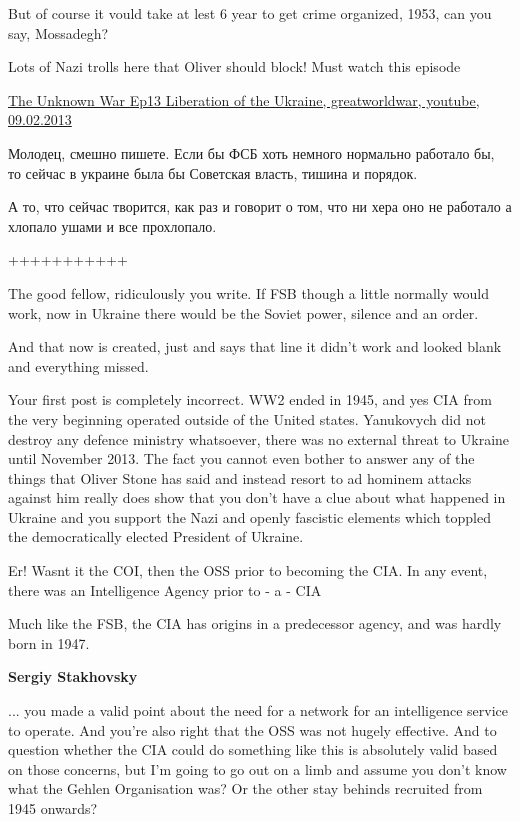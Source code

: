 \begin{itemize}
\begin{itemize}

But of course it vould take at lest 6 year to get crime organized, 1953, can
you say, Mossadegh?


Lots of Nazi trolls here that Oliver should block! Must watch this episode

\href{https://www.youtube.com/watch?v=vd6ngRVovaI}{%
The Unknown War Ep13 Liberation of the Ukraine, greatworldwar, youtube, 09.02.2013%
}


Молодец, смешно пишете. Если бы ФСБ хоть немного нормально работало бы, то
сейчас в украине была бы Советская власть, тишина и порядок.

А то, что сейчас творится, как раз и говорит о том, что ни хера оно не работало
а хлопало ушами и все прохлопало.

+++++++++++

The good fellow, ridiculously you write. If FSB though a little normally would
work, now in Ukraine there would be the Soviet power, silence and an order.

And that now is created, just and says that line it didn't work and looked
blank and everything missed.


Your first post is completely incorrect. WW2 ended in 1945, and yes CIA from
the very beginning operated outside of the United states. Yanukovych did not
destroy any defence ministry whatsoever, there was no external threat to
Ukraine until November 2013. The fact you cannot even bother to answer any of
the things that Oliver Stone has said and instead resort to ad hominem attacks
against him really does show that you don't have a clue about what happened in
Ukraine and you support the Nazi and openly fascistic elements which toppled
the democratically elected President of Ukraine.


Er! Wasnt it the COI, then the OSS prior to becoming the CIA. In any event,
there was an Intelligence Agency prior to - a - CIA


Much like the FSB, the CIA has origins in a predecessor agency, and was hardly
born in 1947.

\textbf{Sergiy Stakhovsky} 

... you made a valid point about the need for a network for an intelligence
service to operate. And you're also right that the OSS was not hugely
effective. And to question whether the CIA could do something like this is
absolutely valid based on those concerns, but I'm going to go out on a limb and
assume you don't know what the Gehlen Organisation was? Or the other stay
behinds recruited from 1945 onwards?


\end{itemize}
\end{itemize}
